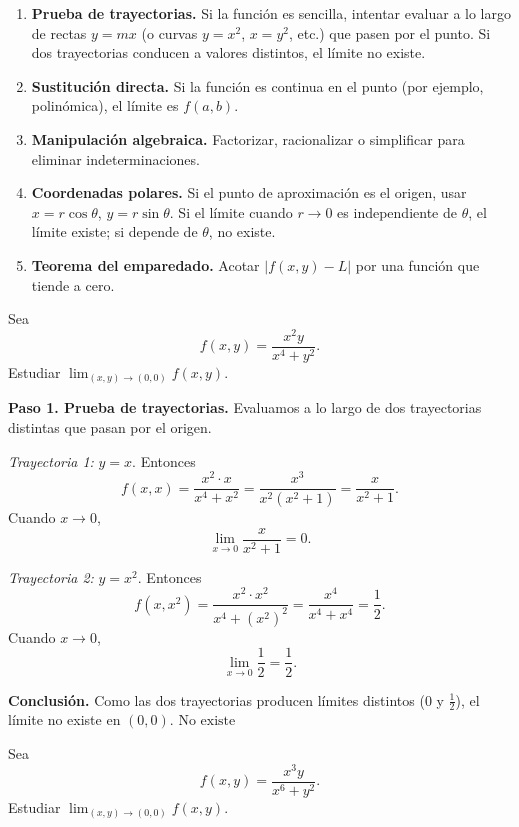\begin{pasos}
\begin{enumerate}
    \item \textbf{Prueba de trayectorias.} Si la función es sencilla,
    intentar evaluar a lo largo de rectas $y=mx$ (o curvas $y=x^2$,
    $x=y^2$, etc.) que pasen por el punto. Si dos trayectorias
    conducen a valores distintos, el límite no existe.
    \item \textbf{Sustitución directa.} Si la función es continua en el
    punto (por ejemplo, polinómica), el límite es $f(a,b)$.
    \item \textbf{Manipulación algebraica.} Factorizar, racionalizar o
    simplificar para eliminar indeterminaciones.
    \item \textbf{Coordenadas polares.} Si el punto de aproximación es
    el origen, usar $x=r\cos\theta$, $y=r\sin\theta$. Si el límite
    cuando $r\to 0$ es independiente de $\theta$, el límite existe; si
    depende de $\theta$, no existe.
    \item \textbf{Teorema del emparedado.} Acotar $|f(x,y)-L|$ por
    una función que tiende a cero.
\end{enumerate}
\end{pasos}

\begin{example}
Sea
\[
f(x,y) = \frac{x^2 y}{x^4 + y^2}.
\]
Estudiar $\lim_{(x,y)\to(0,0)} f(x,y)$.
\end{example}

\begin{myproof}
\textbf{Paso 1. Prueba de trayectorias.} Evaluamos a lo largo de dos
trayectorias distintas que pasan por el origen.

\textit{Trayectoria 1:} $y=x$. Entonces
\[
f(x,x) = \frac{x^2\cdot x}{x^4+x^2} = \frac{x^3}{x^2(x^2+1)}
        = \frac{x}{x^2+1}.
\]
Cuando $x\to 0$,
\[
\lim_{x\to 0} \frac{x}{x^2+1} = 0.
\]

\textit{Trayectoria 2:} $y=x^2$. Entonces
\[
f(x,x^2) = \frac{x^2\cdot x^2}{x^4+(x^2)^2}
          = \frac{x^4}{x^4+x^4} = \frac{1}{2}.
\]
Cuando $x\to 0$,
\[
\lim_{x\to 0} \frac{1}{2} = \frac{1}{2}.
\]

\textbf{Conclusión.} Como las dos trayectorias producen límites
distintos ($0$ y $\frac12$), el límite no existe en $(0,0)$.
$\boxed{\text{No existe}}$
\end{myproof}

\begin{example}
Sea
\[
f(x,y) = \frac{x^3 y}{x^6 + y^2}.
\]
Estudiar $\lim_{(x,y)\to(0,0)} f(x,y)$.
\end{example}

